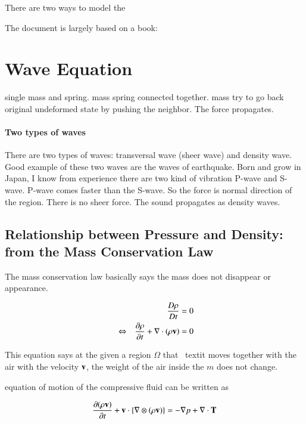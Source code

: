 %
There are two ways to model the

The document is largely based on a book: \cite{ihlenburg 1998 finite}



\section{Wave Equation}

single mass and spring.
%
mass spring connected together.
%
mass try to go back original undeformed state by pushing the neighbor.
%
The force propagates.

\paragraph{Two types of waves}
There are two types of waves: transversal wave (sheer wave) and density wave.
%
Good example of these two waves are the waves of earthquake.
%
Born and grow in Japan, I know from experience there are two kind of vibration P-wave and S-wave.
%
P-wave comes faster than the S-wave.
%
%
So the force is normal direction of the region. There is no sheer force.
%
The sound propagates as density waves.
%




\subsection{Relationship between Pressure and Density: from the Mass Conservation Law}

The mass conservation law basically says the mass does not disappear or appearance.
%
\begin{tcolorbox}[title=Mass Conservation Law]
\begin{eqnarray}
&&\frac{D \rho}{D t} = 0 \\
&\Leftrightarrow& \frac{\partial\rho}{\partial t} + \nabla\cdot(\rho\mathbf{v}) = 0
\label{eqn:mass_conservation}
\end{eqnarray}
\end{tcolorbox}
%
This equation says at the given a region $\Omega$ that \ textit {moves together} with the air with the velocity $\mathbf{v}$, the weight of the air inside the $m$ does not change.
%

equation of motion of the compressive fluid can be written as
\begin{tcolorbox}[title=Compressive Navier - Stokes Equation]
\begin{equation}
\frac{\partial (\rho \mathbf{v})}{\partial t} + \mathbf{v}\cdot\{\nabla \otimes (\rho \mathbf{v})\} = -\nabla p + \nabla\cdot\mathbf{T}
\label{eqn:compressive_fluid}
\end{equation}
\end{tcolorbox}


